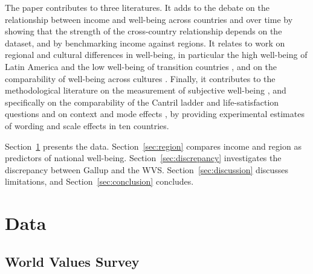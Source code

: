 \documentclass[12pt]{article}
\begin{document}
The paper contributes to three literatures. It adds to the debate on the relationship between income and well-being across countries and over time \citep{easterlin_does_1974,easterlin_happiness_2010,stevenson_economic_2008,deaton_income_2008,jebb_happiness_2018} by showing that the strength of the cross-country relationship depends on the dataset, and by benchmarking income against regions. It relates to work on regional and cultural differences in well-being, in particular the high well-being of Latin America \citep{graham_paradox_2009,rojas_handbook_2016} and the low well-being of transition countries \citep{guriev_unhappiness_2009}, and on the comparability of well-being across cultures \citep{diener_culture_2000,exton_comparing_2015,senik_french_2014}. Finally, it contributes to the methodological literature on the measurement of subjective well-being \citep{kahneman_developments_2006,oecd_guidelines_2013,stone_subjective_2013,bond_sad_2019,kaiser_scientific_2022}, and specifically on the comparability of the Cantril ladder and life-satisfaction questions \citep{bjornskov_how_2010,nilsson_cantril_2024} and on context and mode effects \citep{deaton_understanding_2016,dolan_happy_2016}, by providing experimental estimates of wording and scale effects in ten countries.

Section~\ref{sec:data} presents the data. Section~\ref{sec:region} compares income and region as predictors of national well-being. Section~\ref{sec:discrepancy} investigates the discrepancy between Gallup and the WVS. Section~\ref{sec:discussion} discusses limitations, and Section~\ref{sec:conclusion} concludes.

\section{Data}\label{sec:data}
\subsection{World Values Survey}\label{subsec:wvs}
\end{document}

